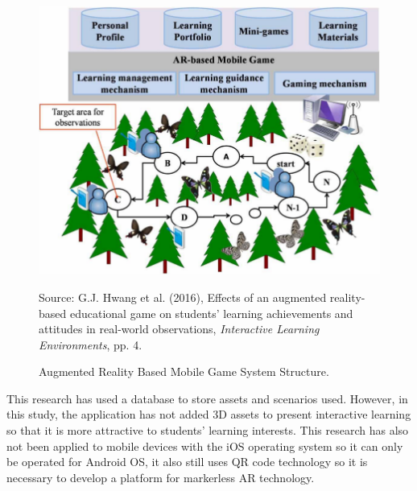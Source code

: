 \begin{figure}[h!]
    \centering
    \includegraphics[scale=0.7]{figures/penelitian1.png}
    \caption{Augmented Reality Based Mobile Game System Structure.}
    \vspace{1em}
   \small Source: G.J. Hwang et al. (2016), Effects of an augmented reality-based educational game on students’ learning achievements and attitudes in real-world observations, \textit{Interactive Learning Environments}, pp. 4.
    \label{fig:my_label}
\end{figure}
This research has used a database to store assets and scenarios used. However, in this study, the application has not added 3D assets to present interactive learning so that it is more attractive to students' learning interests. This research has also not been applied to mobile devices with the iOS operating system so it can only be operated for Android OS, it also still uses QR code technology so it is necessary to develop a platform for markerless AR technology.

